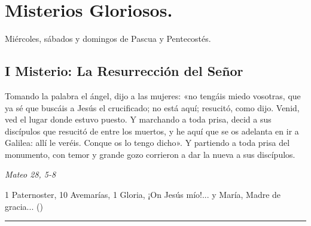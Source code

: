 \documentclass[./rosary.tex]{subfiles}
\begin{document}
\section*{Misterios Gloriosos.}
Miércoles, sábados y domingos de Pascua y Pentecostés.

\subsection*{I Misterio: La Resurrección del Señor}

Tomando la palabra el ángel, dijo a las mujeres: «no tengáis miedo vosotras, que ya sé que buscáis a Jesús el crucificado;
no está aquí; resucitó, como dijo. Venid, ved el lugar donde estuvo puesto. Y marchando a toda prisa,
decid a sus discípulos que resucitó de entre los muertos, y he aquí que se os adelanta en ir a Galilea: allí le veréis.
Conque os lo tengo dicho». Y partiendo a toda prisa del monumento, con temor y grande gozo corrieron a dar la nueva a sus discípulos.

\begin{flushright}
      \emph{Mateo 28, 5-8}
\end{flushright}

1 Paternoster, 10 Avemarías, 1 Gloria, ¡On Jesús mío!... y María, Madre de gracia... ()

\rule{\textwidth}{0.5pt}
\end{document}
